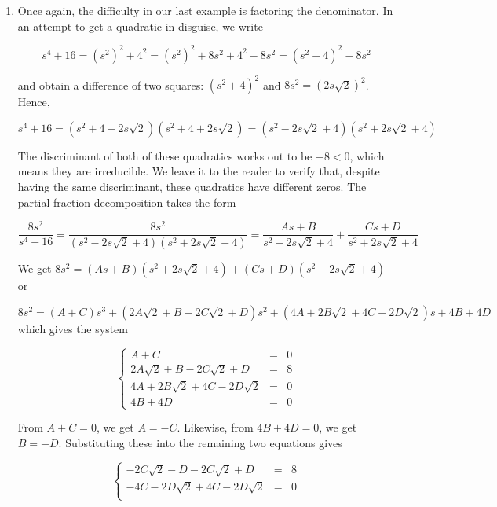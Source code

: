 \documentclass{ximera}
\begin{document}
\begin{example}
\begin{enumerate}
We have $A = 1$ and $B = 0$ from which we get $C = 2$ and $D = -1$.  Our final answer is

\[ \frac{z^3+5z-1}{z^4+6z^2+9} = \frac{z}{z^2+3} + \frac{2z-1}{\left(z^2+3\right)^2}\]

\item  Once again, the difficulty in our last example is factoring the denominator.  In an attempt to get a quadratic in disguise, we write 

\[s^4 + 16 = \left(s^2\right)^2 + 4^2 = \left(s^2\right)^2 + 8s^2 + 4^2 - 8s^2 = \left(s^2+4\right)^2 - 8s^2\]

and obtain a difference of two squares:  $\left(s^2+4\right)^2$ and $8s^2 = \left(2s\sqrt{2}\right)^2$.  Hence,

\[s^4 + 16 = \left(s^2 + 4 - 2s\sqrt{2}\right)\left(s^2 + 4 + 2s\sqrt{2}\right) =\left(s^2 - 2s\sqrt{2} + 4\right)\left(s^2 + 2s\sqrt{2}+4 \right)  \]

The discriminant of both of these quadratics works out to be $-8 < 0$, which means they are irreducible.  We leave it to the reader to verify that, despite having the same discriminant, these quadratics have different zeros.  The partial fraction decomposition takes the form

\[ \frac{8s^2}{s^4+16} = \frac{8s^2}{\left(s^2 - 2s\sqrt{2} + 4\right)\left(s^2 + 2s\sqrt{2}+4 \right)} = \frac{As+B}{s^2 - 2s\sqrt{2} + 4} + \frac{Cs+D}{s^2 + 2s\sqrt{2} + 4}\]

We get $8s^2 = (As+B)\left(s^2 + 2s\sqrt{2}+4 \right) + (Cs+D)\left(s^2 - 2s\sqrt{2} + 4\right)$ or 

\[8s^2 = (A+C)s^3 + (2A\sqrt{2} + B - 2C\sqrt{2}+D)s^2 + (4A + 2B\sqrt{2}+4C - 2D\sqrt{2})s + 4B + 4D \] which gives the system

\[ \left\{ \begin{array}{rcr} A + C & = & 0 \\ 2A\sqrt{2} + B - 2C\sqrt{2}+D & = & 8 \\ 4A + 2B\sqrt{2}+4C - 2D\sqrt{2} & = & 0 \\ 4B + 4D  & = & 0 \end{array} \right.\]

From $A+C = 0$, we get $A = -C$.  Likewise, from $4B + 4D = 0$, we get $B = -D$.  Substituting these into the remaining two equations gives

\[ \left\{ \begin{array}{rcr}  -2C\sqrt{2} -D - 2C\sqrt{2}+D & = & 8 \\ -4C - 2D\sqrt{2}+4C - 2D\sqrt{2} & = & 0 \\ \end{array} \right.\] 


\end{enumerate}
\end{example}
\end{document}
